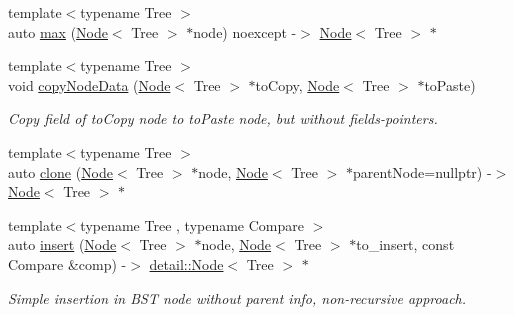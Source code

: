 \begin{DoxyCompactItemize}
\item 
{\footnotesize template$<$typename Tree $>$ }\\auto \hyperlink{namespacelab_1_1forest_1_1detail_a1b854c05579f96cde71983fa181a4f5f}{max} (\hyperlink{structlab_1_1forest_1_1detail_1_1Node}{Node}$<$ Tree $>$ $\ast$node) noexcept -\/$>$ \hyperlink{structlab_1_1forest_1_1detail_1_1Node}{Node}$<$ Tree $>$ $\ast$
\item 
\mbox{\label{namespacelab_1_1forest_1_1detail_a21acd0d04e9a7cae68b7fe60da6d1948}} 
{\footnotesize template$<$typename Tree $>$ }\\void \hyperlink{namespacelab_1_1forest_1_1detail_a21acd0d04e9a7cae68b7fe60da6d1948}{copy\+Node\+Data} (\hyperlink{structlab_1_1forest_1_1detail_1_1Node}{Node}$<$ Tree $>$ $\ast$to\+Copy, \hyperlink{structlab_1_1forest_1_1detail_1_1Node}{Node}$<$ Tree $>$ $\ast$to\+Paste)
\begin{DoxyCompactList}\small\item\em Copy field of to\+Copy node to to\+Paste node, but without fields-\/pointers. \end{DoxyCompactList}\item 
{\footnotesize template$<$typename Tree $>$ }\\auto \hyperlink{namespacelab_1_1forest_1_1detail_a1268b660bcac79b1fb63758a157cba64}{clone} (\hyperlink{structlab_1_1forest_1_1detail_1_1Node}{Node}$<$ Tree $>$ $\ast$node, \hyperlink{structlab_1_1forest_1_1detail_1_1Node}{Node}$<$ Tree $>$ $\ast$parent\+Node=nullptr) -\/$>$ \hyperlink{structlab_1_1forest_1_1detail_1_1Node}{Node}$<$ Tree $>$ $\ast$
\item 
\mbox{\label{namespacelab_1_1forest_1_1detail_a1036d00410feb4a2aa3683ec5831f071}} 
{\footnotesize template$<$typename Tree , typename Compare $>$ }\\auto \hyperlink{namespacelab_1_1forest_1_1detail_a1036d00410feb4a2aa3683ec5831f071}{insert} (\hyperlink{structlab_1_1forest_1_1detail_1_1Node}{Node}$<$ Tree $>$ $\ast$node, \hyperlink{structlab_1_1forest_1_1detail_1_1Node}{Node}$<$ Tree $>$ $\ast$to\+\_\+insert, const Compare \&comp) -\/$>$ \hyperlink{structlab_1_1forest_1_1detail_1_1Node}{detail\+::\+Node}$<$ Tree $>$ $\ast$
\begin{DoxyCompactList}\small\item\em Simple insertion in B\+ST node without parent info, non-\/recursive approach. \end{DoxyCompactList}\item 

\end{DoxyCompactItemize}
